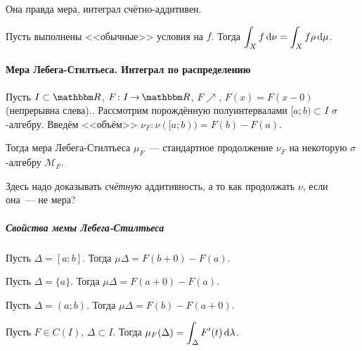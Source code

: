\documentclass[draft, timbord]{longnotes}
\begin{document}
\begin{rem*}
  Она правда мера, интеграл счётно-аддитивен.
\end{rem*}

\begin{thrm}\label{thrm:meas::discint::intchg}
  Пусть выполнены <<обычные>> условия на $f$. Тогда 
  $\displaystyle \int_X f \, \mathrm{d} \nu = \int_X f \rho \, \mathrm{d} \mu$.
\end{thrm}

\paragraph{Мера Лебега-Стилтьеса. Интеграл по распределению}
\label{par:meas::lebstil}

\begin{defn}\label{defn:meas::lebstil::meas}
  Пусть $I \subset \R$, $F \colon I \to \R$, $F \nearrow$, $F(x) = F(x-0)$ 
  (непрерывна слева).\note{А можно и без. Тогда $\nu([a;b)) = F(b-0) - F(a-0)$,
  см.~\ref{makpodk}}.
  Рассмотрим порождённую полуинтервалами $[a;b) \subset I$ $\sigma$-алгебру.
  Введём <<объём>> $\nu_F \colon \nu([a;b)) = F(b) - F(a)$.
  
  Тогда мера Лебега-Стилтьеса $\mu_F$~--- стандартное продолжение $\nu_F$ на некоторую
  $\sigma$-алгебру $\mathcal M_F$.
\end{defn}

\begin{rem}
  Здесь надо доказывать \emph{счётную} аддитивность, а то как продолжать $\nu$, если она~--- не
  мера?
\end{rem}

\subparagraph{Свойства мемы Лебега-Стилтьеса}

\begin{prop}\label{prop:meas::lebstil::clos}
  Пусть $\Delta = [a;b]$. Тогда $\mu \Delta  = F(b+0) - F(a)$.
\end{prop}

\begin{prop}\label{prop:meas::lebstil::point}
  Пусть $\Delta = \{a\}$. Тогда $\mu \Delta  = F(a+0) - F(a)$.
\end{prop}

\begin{prop}\label{prop:meas::lebstil::open}
  Пусть $\Delta = (a;b)$. Тогда $\mu \Delta  = F(b) - F(a+0)$.
\end{prop}

\begin{lem}\label{lem:meas::lebstil::smoothF}
  Пусть $F \in C(I)$, $\Delta \subset I$.
  Тогда $\mu_F (\Delta) = \displaystyle\int_\Delta F'(t) \, \mathrm{d} \lambda$.
\end{lem}
\end{document}
